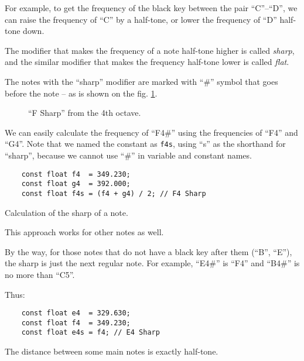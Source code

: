\documentclass[../sparc.tex]{subfiles}
\begin{document}
For example, to get the frequency of the black key between the pair ``C''--``D'',
we can raise the frequency of ``C'' by a half-tone, or lower the frequency of
``D'' half-tone down.

The modifier that makes the frequency of a note half-tone higher is called
\emph{sharp}, and the similar modifier that makes the frequency half-tone lower
is called \emph{flat}.


The notes with the ``sharp'' modifier are marked with ``\#'' symbol that goes
before the note -- as is shown on the fig. \ref{fig:lilypond-f4-sharp}.

\begin{figure}[ht]
  \centering
  \caption{``F Sharp'' from the 4th octave.}
  \label{fig:lilypond-f4-sharp}
\end{figure}

We can easily calculate the frequency of ``F4\#'' using the frequencies of
``F4'' and ``G4''.  Note that we named the constant as \texttt{f4s}, using ``s''
as the shorthand for ``sharp'', because we cannot use ``\#'' in variable and
constant names.

\begin{listing}[ht]
  \begin{verbatim}
    const float f4  = 349.230;
    const float g4  = 392.000;
    const float f4s = (f4 + g4) / 2; // F4 Sharp
  \end{verbatim}
  \label{listing:music-f4-sharp}
  \caption{Calculation of the sharp of a note.}
\end{listing}

This approach works for other notes as well.

By the way, for those notes that do not have a black key after them (``B'',
``E''), the sharp is just the next regular note.  For example, ``E4\#'' is
``F4'' and ``B4\#'' is no more than ``C5''.

Thus:

\begin{listing}[ht]
  \begin{verbatim}
    const float e4  = 329.630;
    const float f4  = 349.230;
    const float e4s = f4; // E4 Sharp
  \end{verbatim}
  \caption{The distance between some main notes is exactly half-tone.}
  \label{listing:music-e4-sharp}
\end{listing}
\end{document}
